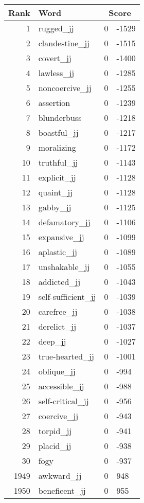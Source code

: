 \begin{longtable}[!htbp]{| rlr@{.}l |}
    \hline
    \textbf{Rank} & \textbf{Word} & \multicolumn{2}{c|}{\textbf{Score}} \\
    \hline
    \endhead
    1 & rugged\_jj & 0 & -1529 \\
    2 & clandestine\_jj & 0 & -1515 \\
    3 & covert\_jj & 0 & -1400 \\
    4 & lawless\_jj & 0 & -1285 \\
    5 & noncoercive\_jj & 0 & -1255 \\
    6 & assertion & 0 & -1239 \\
    7 & blunderbuss & 0 & -1218 \\
    8 & boastful\_jj & 0 & -1217 \\
    9 & moralizing & 0 & -1172 \\
    10 & truthful\_jj & 0 & -1143 \\
    11 & explicit\_jj & 0 & -1128 \\
    12 & quaint\_jj & 0 & -1128 \\
    13 & gabby\_jj & 0 & -1125 \\
    14 & defamatory\_jj & 0 & -1106 \\
    15 & expansive\_jj & 0 & -1099 \\
    16 & aplastic\_jj & 0 & -1089 \\
    17 & unshakable\_jj & 0 & -1055 \\
    18 & addicted\_jj & 0 & -1043 \\
    19 & self-sufficient\_jj & 0 & -1039 \\
    20 & carefree\_jj & 0 & -1038 \\
    21 & derelict\_jj & 0 & -1037 \\
    22 & deep\_jj & 0 & -1027 \\
    23 & true-hearted\_jj & 0 & -1001 \\
    24 & oblique\_jj & 0 & -994 \\
    25 & accessible\_jj & 0 & -988 \\
    26 & self-critical\_jj & 0 & -956 \\
    27 & coercive\_jj & 0 & -943 \\
    28 & torpid\_jj & 0 & -941 \\
    29 & placid\_jj & 0 & -938 \\
    30 & fogy & 0 & -937 \\
    1949 & awkward\_jj & 0 & 948 \\
    1950 & beneficent\_jj & 0 & 955 \\

\end{longtable}
